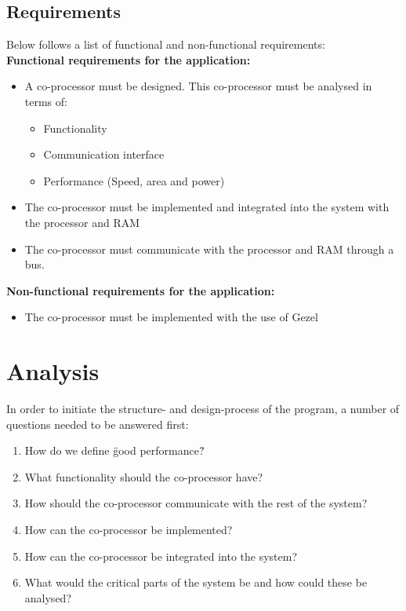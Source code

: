 \documentclass[12pt,a4paper]{article}
\begin{document}
\subsection{Requirements}
Below follows a list of functional and non-functional requirements:\\

\textbf{ Functional requirements for the application:}
\begin{itemize}
	\item A co-processor must be designed. This co-processor must be analysed in terms of:
	\begin{itemize}
	\item Functionality
	\item Communication interface
	\item Performance (Speed, area and power)
	\end{itemize}
	\item The co-processor must be implemented and integrated into the system with the processor and RAM
	\item The co-processor must communicate with the processor and RAM through a bus.

\end{itemize}
\textbf{Non-functional requirements for the application:}
\begin {itemize}
	\item The co-processor must be implemented with the use of Gezel
\end{itemize}

\section{Analysis}
 	In order to initiate the structure- and design-process of the program, a number of questions needed to be answered first:\\
 	
 	\begin{enumerate}
	\item How do we define \"good performance\"?
	\item What functionality should the co-processor have?
	\item How should the co-processor communicate with the rest of the system?
	\item How can the co-processor be implemented?
	\item How can the co-processor be integrated into the system?
	\item What would the critical parts of the system be and how could these be analysed?
\end{enumerate}
\end{document}
